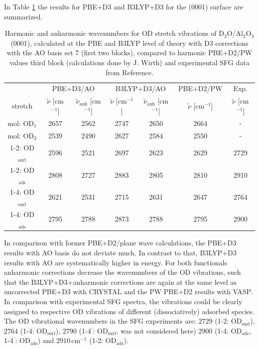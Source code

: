 \documentclass[11pt,DIV=13,BCOR=5mm,a4paper,headinclude]{scrbook}
\begin{document}
In Table \ref{tab:freqs_0001_crystal} the results for PBE+D3 and B3LYP+D3 for the (0001) surface are summarized.
\begin{table}[!h]
  \centering
  \caption{Harmonic and anharmonic wavenumbers for OD stretch vibrations of D$_2$O/Al$_2$O$_3$(0001), calculated at the PBE and B3LYP level of theory with D3 corrections with the AO basis set 7 (first two blocks), compared to harmonic PBE+D2/PW values third block (calculations done by J. Wirth\cite{Wirth2014thesis}) and experimental SFG data from Reference\cite{Wirth2014}.}
  \begin{tabular}{ccc|cc|c|c}
  \toprule
   & \multicolumn{2}{c}{PBE+D3/AO} & \multicolumn{2}{c}{B3LYP+D3/AO} &PBE+D2/PW&Exp.\cite{Wirth2014}\\
  stretch & $\tilde{\nu}$ [cm$^{-1}$] &$\tilde{\nu}_\textrm{anh}$ [cm$^{-1}$] &$\tilde{\nu}$ [cm$^{-1}$] & $\tilde{\nu}_\textrm{anh}$ [cm$^{-1}$]& $\tilde{\nu}$ [cm$^{-1}$]& $\tilde{\nu}$ [cm$^{-1}$]\\\midrule
  mol: OD$_{\textrm{1}}$    &2657 &2562 &2747 &2650 & 2664&-\\
  mol: OD$_{\textrm{2}}$    &2539 &2490 &2627 &2584 & 2550&-\\
  1-2: OD$_{\textrm{surf}}$ &2596 &2521 &2697 &2623 & 2629&2729\\%
  1-2: OD$_{\textrm{ads}}$  &2808 &2727 &2883 &2805 & 2810&2910\\%
  1-4: OD$_{\textrm{surf}}$ &2621 &2531 &2715 &2631 & 2647&2764\\%
  1-4: OD$_{\textrm{ads}}$  &2795 &2788 &2873 &2788 & 2795&2900\\%
  \bottomrule
    \end{tabular}
  \label{tab:freqs_0001_crystal}
\end{table}
In comparison with former PBE+D2/plane wave calculations, the PBE+D3 results with AO basis do not deviate much.
In contrast to that, B3LYP+D3 results with AO are systematically higher in energy.
For both functionals anharmonic corrections decrease the wavenumbers of the OD vibrations, such that the B3LYP+D3+anharmonic corrections are again at the same level as uncorrected PBE+D3 with CRYSTAL and the PW PBE+D2 results with VASP.
In comparison with experimental SFG spectra\cite{Wirth2014}, the vibrations could be clearly assigned to respective OD vibrations of different (dissociatively) adsorbed species.
The OD vibrational wavenumbers in the SFG experiments\cite{Wirth2014} are: $2729$ (1-2: OD$_{\textrm{surf}}$), $2764$ (1-4: OD$_{\textrm{surf}}$), $2790$ (1-4$^\prime$: OD$_{\textrm{surf}}$, was not considered here) $2900$ (1-4: OD$_{\textrm{ads}}$, 1-4$^\prime$: OD$_{\textrm{ads}}$) and $2910\,$cm$^{-1}$ (1-2: OD$_{\textrm{ads}}$).
\end{document}
